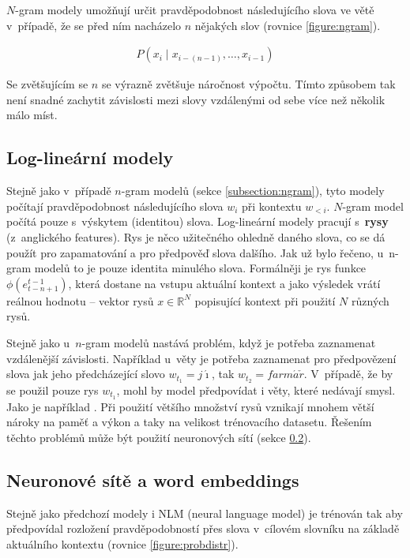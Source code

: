 $N$-gram modely umožňují určit pravděpodobnost následujícího slova ve větě v~případě, že se před ním nacházelo $n$ nějakých slov (rovnice \ref{figure:ngram}).

\begin{align}\label{figure:ngram}
    P(x_{i}\mid x_{{i-(n-1)}},\dots ,x_{{i-1}})
\end{align}

Se zvětšujícím se $n$ se výrazně zvětšuje náročnost výpočtu. Tímto způsobem tak není snadné zachytit závislosti mezi slovy vzdálenými od sebe více než několik málo míst.

\subsection{Log-lineární modely} \label{subsection:loglinear}
Stejně jako v~případě $n$-gram modelů (sekce \ref{subsection:ngram}), tyto modely počítají pravděpodobnost následujícího slova $w_i$ při kontextu $w_{<i}$. $N$-gram model počítá pouze s~výskytem (identitou) slova. Log-lineární modely pracují s~\textbf{rysy} (z~anglického features). Rys je něco užitečného ohledně daného slova, co se dá použít pro zapamatování a pro předpověď slova dalšího. Jak už bylo řečeno, u~n-gram modelů to je pouze identita minulého slova. Formálněji je rys funkce $\phi(e^{t-1}_{t-n+1})$, která dostane na vstupu aktuální kontext a jako výsledek vrátí reálnou hodnotu -- vektor rysů $x \in \mathbb{R}^N$ popisující kontext při použití $N$ různých rysů.

Stejně jako u~$n$-gram modelů nastává problém, když je potřeba zaznamenat vzdálenější závislosti. Například u~věty  je potřeba zaznamenat pro předpovězení slova  jak jeho předcházející slovo $w_{t_1}=j\acute{\imath}$, tak $w_{t_2}=farm\acute{a}\check{r}$. V~případě, že by se použil pouze rys $w_{t_1}$, mohl by model předpovídat i věty, které nedávají smysl. Jako je například . Při použití většího množství rysů vznikají mnohem větší nároky na paměť a výkon a taky na velikost trénovacího datasetu. Řešením těchto problémů může být použití neuronových sítí (sekce \ref{subsection:neuralembeddings}).


\subsection{Neuronové sítě a word embeddings}\label{subsection:neuralembeddings}
Stejně jako předchozí modely i NLM (neural language model) je trénován tak aby předpovídal rozložení pravděpodobností přes slova v~cílovém slovníku na základě aktuálního kontextu (rovnice \ref{figure:probdistr}).

